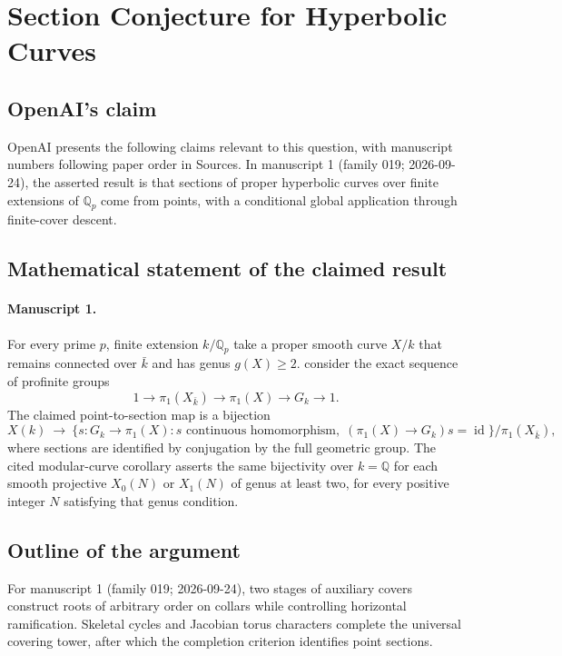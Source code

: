 \documentclass[11pt]{article}
\begin{document}
\section*{Section Conjecture for Hyperbolic Curves}

\subsection{OpenAI's claim}
OpenAI presents the following claims relevant to this question, with manuscript numbers following paper order in Sources. In manuscript 1 (family 019; 2026-09-24), the asserted result is that sections of proper hyperbolic curves over finite extensions of $\mathbb Q_p$ come from points, with a conditional global application through finite-cover descent.

\subsection{Mathematical statement of the claimed result}
\paragraph{Manuscript 1.}
For every prime $p$, finite extension $k/\mathbb Q_p$ take a proper smooth curve $X/k$ that remains connected over $\bar k$ and has genus $g(X)\ge2$. consider the exact sequence of profinite groups
\[
 1\longrightarrow\pi_1(X_{\bar k})\longrightarrow\pi_1(X)
 \longrightarrow G_k\longrightarrow1.
\]
The claimed point-to-section map is a bijection
\[
 X(k)\ \longrightarrow\
 \{s:G_k\to\pi_1(X):s\text{ continuous homomorphism},\;
             (\pi_1(X)\to G_k)s=\operatorname{id}\}/\pi_1(X_{\bar k}),
\]
where sections are identified by conjugation by the full geometric group. The cited modular-curve corollary asserts the same bijectivity over $k=\mathbb Q$ for each smooth projective $X_0(N)$ or $X_1(N)$ of genus at least two, for every positive integer $N$ satisfying that genus condition.

\subsection{Outline of the argument}
For manuscript 1 (family 019; 2026-09-24), two stages of auxiliary covers construct roots of arbitrary order on collars while controlling horizontal ramification. Skeletal cycles and Jacobian torus characters complete the universal covering tower, after which the completion criterion identifies point sections.
\end{document}
